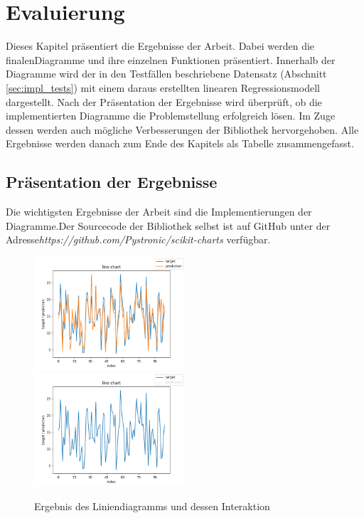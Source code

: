 \chapter{Evaluierung}
\label{cha:evaluation}

Dieses Kapitel präsentiert die Ergebnisse der Arbeit. Dabei werden die finalen\linebreak Diagramme und ihre einzelnen Funktionen präsentiert. Innerhalb der Diagramme wird der in den Testfällen beschriebene Datensatz (Abschnitt \ref{sec:impl_tests}) mit einem daraus erstellten linearen Regressionsmodell dargestellt. Nach der Präsentation der Ergebnisse wird überprüft, ob die implementierten Diagramme die Problemstellung erfolgreich lösen. Im Zuge dessen werden auch mögliche Verbesserungen der Bibliothek hervorgehoben. Alle Ergebnisse werden danach zum Ende des Kapitels als Tabelle zusammengefasst.

\section{Präsentation der Ergebnisse}
\label{sec:eval_presentation}

Die wichtigsten Ergebnisse der Arbeit sind die Implementierungen der Diagramme.\linebreak Der Sourcecode der Bibliothek selbst ist auf GitHub unter der Adresse\linebreak \emph{https://github.com/Pystronic/scikit-charts} verfügbar.

\begin{figure}[H]
    \includegraphics[width=0.5\textwidth]{images/exm_liniendiagramm.png}
    \hfill
    \includegraphics[width=0.5\textwidth]{images/exm_liniendiagramm_interacted.png}
    \caption{Ergebnis des Liniendiagramms und dessen Interaktion}
    \label{fig:eval_line_chart}
\end{figure}

